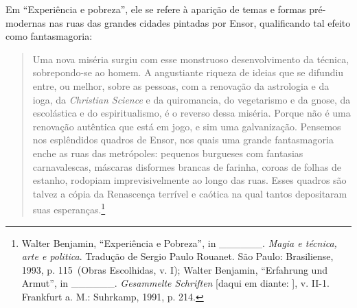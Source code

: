 Em ``Experiência e pobreza'', ele se refere à aparição de temas e formas
pré-modernas nas ruas das grandes cidades pintadas por Ensor,
qualificando tal efeito como fantasmagoria:

\begin{quote}
Uma nova miséria surgiu com esse monstruoso desenvolvimento da técnica,
sobrepondo-se ao homem. A angustiante riqueza de ideias que se difundiu
entre, ou melhor, sobre as pessoas, com a renovação da astrologia e da
ioga, da \emph{Christian Science} e da quiromancia, do vegetarismo e da
gnose, da escolástica e do espiritualismo, é o reverso dessa miséria.
Porque não é uma renovação autêntica que está em jogo, e sim uma
galvanização. Pensemos nos esplêndidos quadros de Ensor, nos quais uma
grande fantasmagoria enche as ruas das metrópoles: pequenos burgueses
com fantasias carnavalescas, máscaras disformes brancas de farinha,
coroas de folhas de estanho, rodopiam imprevisivelmente ao longo das
ruas. Esses quadros são talvez a cópia da Renascença terrível e caótica
na qual tantos depositaram suas esperanças.\footnote{Walter Benjamin,
  ``Experiência e Pobreza'', in \_\_\_\_\_\_. \emph{Magia e técnica,
  arte e politica}. Tradução de Sergio Paulo Rouanet. São Paulo:
  Brasiliense, 1993, p. 115~(Obras Escolhidas, v. I); Walter Benjamin,
  ``Erfahrung und Armut'', in \_\_\_\_\_\_. \emph{Gesammelte Schriften}
  [daqui em diante: ], v. II-1. Frankfurt a. M.: Suhrkamp, 1991,
  p. 214.}
\end{quote}

